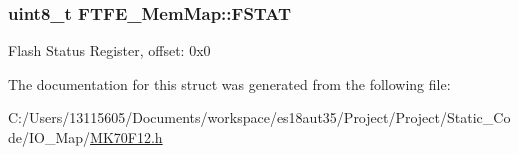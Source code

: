\subsubsection[{F\+S\+T\+A\+T}]{\setlength{\rightskip}{0pt plus 5cm}uint8\+\_\+t F\+T\+F\+E\+\_\+\+Mem\+Map\+::\+F\+S\+T\+A\+T}\label{struct_f_t_f_e___mem_map_a7e8a4e06df758e3dc251260d71818be8}
Flash Status Register, offset\+: 0x0 

The documentation for this struct was generated from the following file\+:\begin{DoxyCompactItemize}
\item 
C\+:/\+Users/13115605/\+Documents/workspace/es18aut35/\+Project/\+Project/\+Static\+\_\+\+Code/\+I\+O\+\_\+\+Map/\hyperlink{_m_k70_f12_8h}{M\+K70\+F12.\+h}\end{DoxyCompactItemize}

